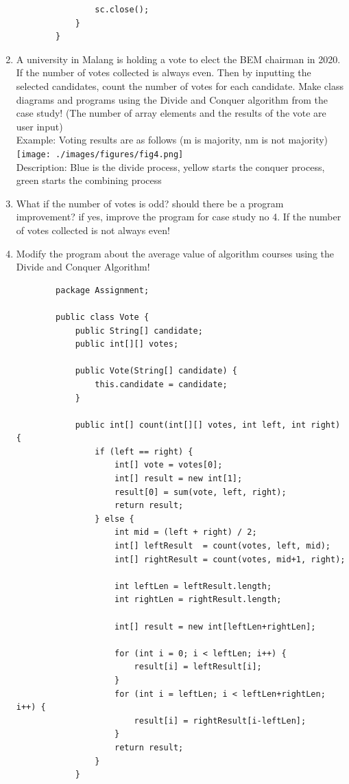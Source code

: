 \documentclass[12pt,titlepage]{article}
\begin{document}
\begin{enumerate}
\begin{verbatim}
                sc.close();
            }
        }
    \end{verbatim}
    \item A university in Malang is holding a vote to elect the BEM chairman in 2020. If the number of votes collected is always even. Then by inputting the selected candidates, count the number of votes for each candidate. Make class diagrams and programs using the Divide and Conquer algorithm from the case study! (The number of array elements and the results of the vote are user input) \mbox{}\\
    Example: Voting results are as follows (m is majority, nm is not majority)
    \texttt{[image: ./images/figures/fig4.png]}
    \mbox{}\\
    Description: Blue is the divide process, yellow starts the conquer process, green starts the combining process
    \item What if the number of votes is odd? should there be a program improvement? if yes, improve the program for case study no 4. If the number of votes collected is not always even!
    \item Modify the program about the average value of algorithm courses using the Divide and Conquer Algorithm!
    
    \begin{verbatim}
        package Assignment;

        public class Vote {
            public String[] candidate;
            public int[][] votes;

            public Vote(String[] candidate) { 
                this.candidate = candidate;
            }

            public int[] count(int[][] votes, int left, int right) {
                if (left == right) {
                    int[] vote = votes[0];
                    int[] result = new int[1];
                    result[0] = sum(vote, left, right);
                    return result;
                } else {
                    int mid = (left + right) / 2;
                    int[] leftResult  = count(votes, left, mid);
                    int[] rightResult = count(votes, mid+1, right);

                    int leftLen = leftResult.length;
                    int rightLen = rightResult.length;

                    int[] result = new int[leftLen+rightLen];

                    for (int i = 0; i < leftLen; i++) {
                        result[i] = leftResult[i];
                    }
                    for (int i = leftLen; i < leftLen+rightLen; i++) {
                        result[i] = rightResult[i-leftLen];
                    }
                    return result;
                }
            }


\end{verbatim}
\end{enumerate}
\end{document}
